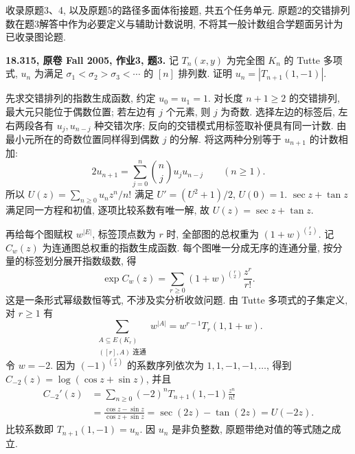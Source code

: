 收录原题3、4, 以及原题5的路径多面体衔接题, 共五个任务单元.
原题2的交错排列数在题3解答中作为必要定义与辅助计数说明,
不将其一般计数组合学题面另计为已收录图论题.

\begin{exercise}\label{mit:18315-hw3-q3}
\textbf{18.315, 原卷 Fall 2005, 作业3, 题3.}
记 $T_n(x,y)$ 为完全图 $K_n$ 的 Tutte 多项式,
$u_n$ 为满足 $\sigma_1<\sigma_2>\sigma_3<\cdots$ 的 $[n]$ 排列数.
证明 $u_n=|T_{n+1}(1,-1)|$.
\end{exercise}
\begin{solution}
先求交错排列的指数生成函数, 约定 $u_0=u_1=1$.
对长度 $n+1\ge2$ 的交错排列, 最大元只能位于偶数位置;
若左边有 $j$ 个元素, 则 $j$ 为奇数. 选择左边的标签后,
左右两段各有 $u_j,u_{n-j}$ 种交错次序; 反向的交错模式用标签取补便具有同一计数.
由最小元所在的奇数位置同样得到偶数 $j$ 的分解. 将这两种分别等于 $u_{n+1}$ 的计数相加:
\[
2u_{n+1}=\sum_{j=0}^{n}\binom nj u_j u_{n-j}\qquad(n\ge1).
\]
所以 $U(z)=\sum_{n\ge0}u_nz^n/n!$ 满足
$U'=(U^2+1)/2$, $U(0)=1$.
$\sec z+\tan z$ 满足同一方程和初值, 逐项比较系数有唯一解,
故 $U(z)=\sec z+\tan z$.

再给每个图赋权 $w^{|E|}$, 标签顶点数为 $r$ 时, 全部图的总权重为
$(1+w)^{\binom r2}$. 记 $C_w(z)$ 为连通图总权重的指数生成函数.
每个图唯一分成无序的连通分量, 按分量的标签划分展开指数级数, 得
\[
\exp C_w(z)=\sum_{r\ge0}(1+w)^{\binom r2}\frac{z^r}{r!}.
\]
这是一条形式幂级数恒等式, 不涉及实分析收敛问题.
由 Tutte 多项式的子集定义, 对 $r\ge1$ 有
\[
\sum_{\substack{A\subseteq E(K_r)\\([r],A)\text{ 连通}}}w^{|A|}
=w^{r-1}T_r(1,1+w).
\]
令 $w=-2$. 因为 $(-1)^{\binom r2}$ 的系数序列依次为 $1,1,-1,-1,\ldots$,
得到 $C_{-2}(z)=\log(\cos z+\sin z)$, 并且
\begin{align*}
C_{-2}'(z)
&=\sum_{n\ge0}(-2)^nT_{n+1}(1,-1)\frac{z^n}{n!}\\
&=\frac{\cos z-\sin z}{\cos z+\sin z}
=\sec(2z)-\tan(2z)=U(-2z).
\end{align*}
比较系数即 $T_{n+1}(1,-1)=u_n$. 因 $u_n$ 是非负整数,
原题带绝对值的等式随之成立.
\end{solution}


